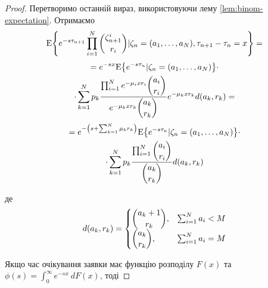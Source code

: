 \documentclass{KnuBulletin}
\begin{document}
\begin{multicols}{2}
\begin{proof}
    Перетворимо останній вираз, використовуючи лему \ref{lem:binom-expectation}. Отримаємо
    \begin{multline*}
    {{\rm E}{\left\{ e^{-s \tau_{n+1}} \prod_{i=1}^N \dbinom{\zeta_{n+1}^i}{r_i} |
        \zeta_n=(a_1,\dots,a_N), \tau_{n+1}-\tau_n=x\right\}}}
    =
    \end{multline*}
    \begin{multline*}        
    =
    e^{-sx}
    {{\rm E}{\left\{ e^{-s \tau_{n}} | \zeta_n=(a_1,\dots,a_N)\right\}}}
    \cdot\\\cdot
    \sum_{k=1}^N p_k
    \frac{
        \prod_{i=1}^N e^{-\mu_i x r_i} \dbinom{a_i}{r_i}
    }{
        e^{-\mu_k x r_k} \dbinom{a_k}{r_k}
    }
    e^{-\mu_k x r_k}
    d(a_k,r_k)
    =    
    \end{multline*}
    \begin{multline*}        
    =
    e^{-\left(s+\sum_{k=1}^{N}\mu_k r_k\right)}
    {{\rm E}{\left\{ e^{-s \tau_{n}} | \zeta_n=(a_1,\dots,a_N)\right\}}}
    \cdot\\\cdot
    \sum_{k=1}^N p_k
    \frac{
        \prod_{i=1}^N  \dbinom{a_i}{r_i}
    }{
    \dbinom{a_k}{r_k}
    }
    d(a_k,r_k)
    \end{multline*}
 
 
     де
     \begin{gather*}
     d(a_k,r_k)=
     \begin{cases}
     \dbinom{a_k+1}{r_k}, & \sum_{i=1}^N a_i < M\\
     \dbinom{a_k}{r_k}, & \sum_{i=1}^N a_i = M
     \end{cases}
     \end{gather*}
     
    
    Якщо час очікування заявки має функцію розподілу $F(x)$ та $\phi(s)=\int_0^\infty e^{-sx}\ dF(x)$, тоді
    

\end{proof}
\end{multicols}
\end{document}
